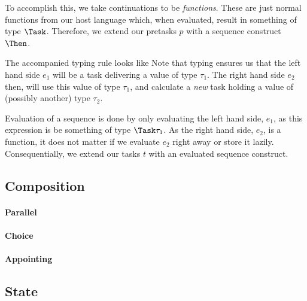 To accomplish this,
we take continuations to be \emph{functions}.
These are just normal functions from our host language which,
when evaluated, result in something of type $\Task$.
Therefore,
we extend our pretasks $p$ with a sequence construct $\Then$.

The accompanied typing rule looks like
Note that typing ensures us that the left hand side $e_1$ will be a task delivering a value of type $\tau_1$.
The right hand side $e_2$ then, will use this value of type $\tau_1$,
and calculate a \emph{new} task holding a value of (possibly another) type $\tau_2$.

Evaluation of a sequence is done by only evaluating the left hand side, $e_1$,
as this expression is be something of type $\Task \tau_1$.
As the right hand side, $e_2$, is a function,
it does not matter if we evaluate $e_2$ right away or store it lazily.
Consequentially, we extend our tasks $t$ with an evaluated sequence construct.



\subsection{Composition}

\paragraph{Parallel}

\paragraph{Choice}

\paragraph{Appointing}


\subsection{State}
